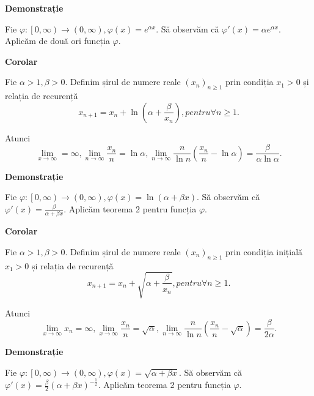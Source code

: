 \documentclass[a4paper,12pt,oneside]{report}
\begin{document}
\textbf{Demonstrație} 

Fie \(\varphi :\left [ 0,\infty  \right ) \to \left ( 0,\infty \right ), \varphi \left ( x \right ) = e^{\alpha x}\). Să observăm că \({\varphi }'\left ( x \right ) = \alpha e^{\alpha x}\). Aplicăm de două ori funcția \(\varphi\). 

\textbf{Corolar} 

Fie \(\alpha > 1,\beta > 0\). Definim șirul de numere reale \(\left ( x_{n} \right )_{n\geq 1}\) prin condiția \(x_{1} > 0\) și relația de recurență 
\begin{displaymath}
  x_{n+1} = x_{n} + \ln\left ( \alpha +\frac{\beta }{x_{n}} \right ), pentru \forall n\geq 1.
\end{displaymath}


Atunci 
\begin{displaymath}
  \lim_{x \to \infty }=\infty ,\lim_{n \to \infty }\frac{x_{n}}{n} = \ln \alpha , \lim_{n \to \infty }\frac{n}{\ln n}\left ( \frac{x_{n}}{n} - \ln \alpha \right ) = \frac{\beta }{\alpha \ln \alpha }.
\end{displaymath}
 
\textbf{Demonstrație} 

Fie \(\varphi :\left [ 0,\infty  \right ) \to \left ( 0,\infty  \right ), \varphi \left ( x \right ) = \ln \left ( \alpha   + \beta x \right )\). Să observăm că \({\varphi }'\left ( x \right ) = \frac{\beta }{\alpha +\beta x}\). Aplicăm teorema 2 pentru funcția \(\varphi\).

\textbf{Corolar} 

Fie \(\alpha > 1,\beta > 0\). Definim șirul de numere reale \(\left ( x_{n} \right )_{n\geq 1}\) prin condiția inițială \(x_{1}> 0\) și relația de recurență
\begin{displaymath}
  x_{n+1} = x_{n} + \sqrt{\alpha +\frac{\beta }{x_{n}}}, pentru \forall n\geq 1.
\end{displaymath}


Atunci 
\begin{displaymath}
  \lim_{x \to \infty }x_{n} = \infty , \lim_{x \to \infty }\frac{x_{n}}{n} = \sqrt{\alpha }, \lim_{n \to \infty }\frac{n}{\ln n}\left ( \frac{x_{n}}{n} -\sqrt{\alpha }\right ) = \frac{\beta }{2\alpha }. 
\end{displaymath}


\textbf{Demonstrație}
 
Fie \(\varphi :\left [ 0,\infty  \right ) \to \left ( 0,\infty  \right ), \varphi \left ( x \right ) = \sqrt{\alpha +\beta x}\). Să observăm că \({\varphi }'\left ( x \right ) = \frac{\beta }{2}\left ( \alpha +\beta x \right )^{-\frac{1}{2}}\). Aplicăm teorema 2 pentru funcția \(\varphi\). 
\end{document}
